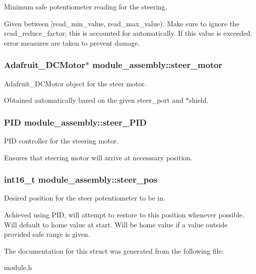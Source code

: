 Minimum safe potentiometer reading for the steering. 

Given between \mbox{[}read\+\_\+min\+\_\+value, read\+\_\+max\+\_\+value). Make sure to ignore the read\+\_\+reduce\+\_\+factor; this is accounted for automatically. If this value is exceeded, error measures are taken to prevent damage. \hypertarget{structmodule__assembly_ace216696d34edd06eef0997f12c35771}{}
\subsubsection[{steer\+\_\+motor}]{\setlength{\rightskip}{0pt plus 5cm}Adafruit\+\_\+\+D\+C\+Motor$\ast$ module\+\_\+assembly\+::steer\+\_\+motor}\label{structmodule__assembly_ace216696d34edd06eef0997f12c35771}


Adafruit\+\_\+\+D\+C\+Motor object for the steer motor. 

Obtained automatically based on the given steer\+\_\+port and $\ast$shield. \hypertarget{structmodule__assembly_a2c3295e46bdfdacf68245649187688f8}{}
\subsubsection[{steer\+\_\+\+P\+I\+D}]{\setlength{\rightskip}{0pt plus 5cm}P\+I\+D module\+\_\+assembly\+::steer\+\_\+\+P\+I\+D}\label{structmodule__assembly_a2c3295e46bdfdacf68245649187688f8}


P\+I\+D controller for the steering motor. 

Ensures that steering motor will arrive at necesssary position. \hypertarget{structmodule__assembly_ac1ba4918f2a686b77c782e637a191348}{}
\subsubsection[{steer\+\_\+pos}]{\setlength{\rightskip}{0pt plus 5cm}int16\+\_\+t module\+\_\+assembly\+::steer\+\_\+pos}\label{structmodule__assembly_ac1ba4918f2a686b77c782e637a191348}


Desired position for the steer potentiometer to be in. 

Achieved using P\+I\+D, will attempt to restore to this position whenever possible. Will default to home value at start. Will be home value if a value outside provided safe range is given. 

The documentation for this struct was generated from the following file\+:\begin{DoxyCompactItemize}
\item 
module.\+h\end{DoxyCompactItemize}
